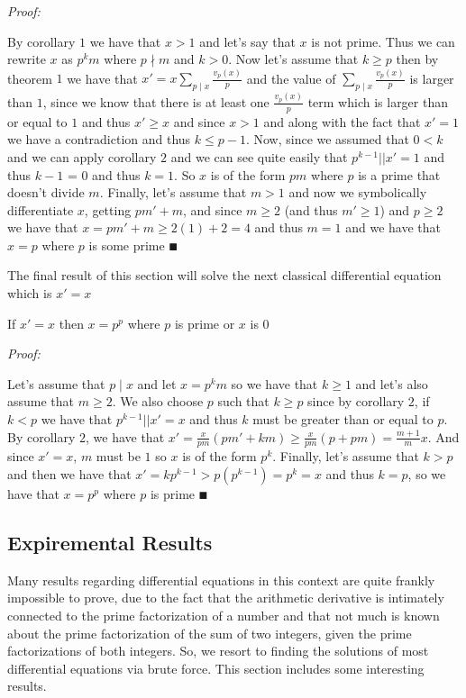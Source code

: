 \documentclass[paper=a4,fontsize=paper,12.5pt]{book}
\newcommand{\3}{\vspace*{3mm}}
\newcommand{\Proof}{\textit{Proof:}}
\newcommand{\D}{\vert \vert}
\newcommand{\Der}[1]{#1\sum_{p \mid #1} \frac{v_p(#1)}{p}}
\newcommand{\Id}[1]{\sum_{p \mid #1} \frac{v_p(#1)}{p}}
\newcommand{\Par}[2]{\frac{v_#2(#1)}{#2}}
\begin{document}
\Proof
 
By corollary $1$ we have that $x>1$ and let's say that $x$ is not prime. Thus we can rewrite $x$ as $p^k m$ where $p \nmid m$ and $k>0$. Now let's assume that $k\geq p$ then by theorem $1$ we have that $x' = \Der{x}$ and the value of $\Id{x}$ is larger than $1$, since we know that there is at least one $\Par{x}{p}$ term which is larger than or equal to $1$ and thus $x' \geq x$ and since $x>1$ and along with the fact that $x' =1$ we have a contradiction and thus $k \leq p-1$. Now, since we assumed that $0<k$ and we can apply corollary $2$ and we can see quite easily that $p^{k-1} \D x' = 1$ and thus $k-1$ = 0 and thus $k=1$. So $x$ is of the form $pm$ where $p$ is a prime that doesn't divide $m$. Finally, let's assume that $m>1$ and now we symbolically differentiate $x$, getting $pm' + m$, and since $m\geq 2$ \vspace*{.05mm} (and thus $m' \geq1$) and $p \geq2$ we have that $x =  pm' + m \geq 2(1) + 2 = 4 $ and thus $m =1$ and we have that $x =p$ where $p$ is some prime $\QED$
 

\3

The final result of this section will solve the next classical differential equation which is $x' = x$

\begin{theorem}

If $x' =x $ then $x = p^p$ where $p$ is prime or $x$ is $0$


\end{theorem}

\Proof

Let's assume that $p \mid x$ and let $x = p^km$ so we have that $k\geq 1$ and let's also assume that $m\geq 2$. We also choose $p$ such that $k \geq p$ since by corollary $2$,  if $k <p $ we have that $p^{k-1} \D x' = x$ and thus $k$ must be greater than or equal to $p$. By corollary $2$, we have that $x' = \frac{x}{pm}(pm' + km) \geq \frac{x}{pm}(p + pm) = \frac{m+1}{m}x$. And since $x' = x$, $m$ must be $1$ so $x$ is of the form $p^k$. Finally, let's assume that $k>p$ and then we have that $x' = kp^{k-1} >  p(p^{k-1}) = p^{k} = x$ and thus $k = p$, so we have that $x = p^p$ where $p$ is prime $\QED$



\subsection*{Expiremental Results} 

Many results regarding differential equations in this context are quite frankly impossible to prove, due to the fact that the arithmetic derivative is intimately connected to the prime factorization of a number and that not much is known about the prime factorization of the sum of two integers, given the prime factorizations of both integers. So, we resort to finding the solutions of most differential equations via brute force. This section includes some interesting results. 
\end{document}
